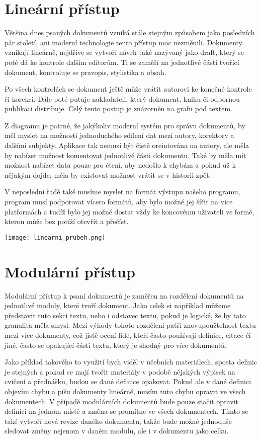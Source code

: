\section{Lineární přístup}

Většina dnes psaných dokumentů vzniká stále stejným způsobem jako posledních pár století, ani moderní technologie tento přístup moc nezměnili.
Dokumenty vznikají lineárně, nejdříve se vytvoří návrh také nazývaný jako draft, který se poté dá ke kontrole dalším editorům. Ti se zaměří
na jednotlivé části tvořící dokument, kontroluje se pravopis, stylistika a obsah.

Po všech kontrolách se dokument ještě může vrátit autorovi ke konečné kontrole či korekci. Dále poté putuje nakladateli, který dokument,
knihu či odbornou publikaci distribuje. Celý tento postup je znázorněn na grafu pod textem.

Z diagramu je patrné, že jakýkoliv moderní systém pro správu dokumentů, by měl myslet na možnosti jednoduchého sdílení dat mezi autory, korektory a dalšími
subjekty. Aplikace tak nemusí být čistě oreintována na autory, ale měla by nabízet možnost komentovat jednotlivé části dokumentu. Také by měla mít možnost
nabízet data pouze pro čtení, aby nedošlo k chybám a pokud už k nějakým dojde, měla by existovat možnost vrátit se v historii zpět.

V neposlední řadě také musíme myslet na formát výstupu našeho programu, program musí podporovat vícero formátů, aby bylo možné jej šířit na více platformách
a tudíž bylo jej možné dostat vždy ke koncovému uživateli ve formě, kterou může bez potíží otevřít a přečíst.

\clearpage
\begin{center}
    \texttt{[image: linearni\_prubeh.png]}
\end{center}

\section{Modulární přístup}

Modulární přístup k psaní dokumentů je zaměřen na rozdělení dokumentů na jednotlivé moduly, které tvoří dokument. Jako celek si například můžeme představit tuto sekci
textu, nebo i odstavec textu, pokud je logické, že by tato granulita měla smysl. Mezi výhody tohoto rozdělení patří znovupoužtelnost textu mezi více dokumenty, což jistě ocení
lidé, kteří často používají definice, citace či jiné, často se opakující části textu, který je shodný pro více dokumentů.

Jako příklad takového to využití bych viděl v učebních materiálech, sposta definic je stejných a pokud se mají tvořit materiály v podobě nějakých výpisek na cvičení a přednášku,
budou se dané definice opakovat. Pokud ale v dané definici objevím chybu a píšu dokumenty lineárně, musím tuto chybu opravit ve všech dokumentech. V případě modulárních dokumentů
bude pouze stačit opravit definici na jednom místě a změna se promítne ve všech dokumentech. Tímto se také vytvoří nová revize daného dokumentu, takže bude možné jednoduše
sledovat změny nejenom v daném modulu, ale i v dokumentu jako celku.
